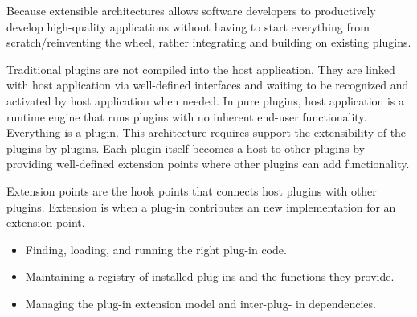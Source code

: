 \documentclass[12pt,letterpaper,boxed]{hmcpset}
\begin{document}
\begin{problem}
\end{problem}

Because extensible architectures allows software developers to productively develop high-quality applications without having to start everything from scratch/reinventing the wheel, rather integrating and building on existing plugins.
\newline

\begin{problem}
\end{problem}

Traditional plugins are not compiled into the host application. They are linked with host application via well-defined interfaces and waiting to be recognized and activated by host application when needed. \newline
\indent
In pure plugins, host application is a runtime engine that runs plugins with no inherent end-user functionality. Everything is a plugin. This architecture requires support the extensibility of the plugins by plugins. Each plugin itself becomes a host to other plugins by providing well-defined extension points where other plugins can add functionality.
\newline

\begin{problem}
\end{problem}

Extension points are the hook points that connects host plugins with other plugins. \newline
\indent
Extension is when a plug-in contributes an new implementation for an extension point.
\newline

\begin{problem}
\end{problem}

\begin{itemize}
\item Finding, loading, and running the right plug-in code.
\item Maintaining a registry of installed plug-ins and the functions they provide.
\item Managing the plug-in extension model and inter-plug- in dependencies.
\end{itemize}
\end{document}
